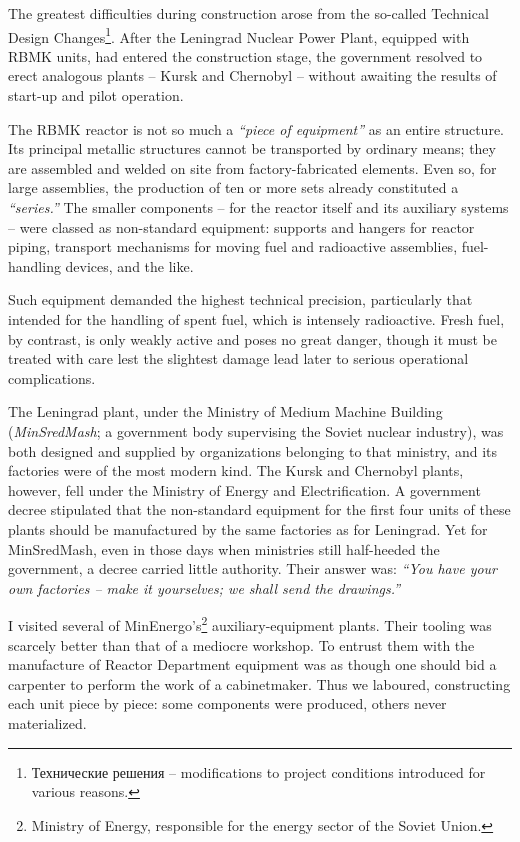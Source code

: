\documentclass[openright]{bookest}
\begin{document}
The greatest difficulties during construction arose from the so-called Technical Design Changes\footnote{Технические решения -- modifications to project conditions introduced for various reasons.}. After the Leningrad Nuclear Power Plant, equipped with RBMK units, had entered the construction stage, the government resolved to erect analogous plants -- Kursk and Chernobyl -- without awaiting the results of start-up and pilot operation.

The RBMK reactor is not so much a \textit{``piece of equipment''} as an entire structure. Its principal metallic structures cannot be transported by ordinary means; they are assembled and welded on site from factory-fabricated elements. Even so, for large assemblies, the production of ten or more sets already constituted a \textit{``series.''} The smaller components -- for the reactor itself and its auxiliary systems -- were classed as non-standard equipment: supports and hangers for reactor piping, transport mechanisms for moving fuel and radioactive assemblies, fuel-handling devices, and the like.

Such equipment demanded the highest technical precision, particularly that intended for the handling of spent fuel, which is intensely radioactive. Fresh fuel, by contrast, is only weakly active and poses no great danger, though it must be treated with care lest the slightest damage lead later to serious operational complications.

The Leningrad plant, under the Ministry of Medium Machine Building (\textit{MinSredMash}; a government body supervising the Soviet nuclear industry), was both designed and supplied by organizations belonging to that ministry, and its factories were of the most modern kind. The Kursk and Chernobyl plants, however, fell under the Ministry of Energy and Electrification. A government decree stipulated that the non-standard equipment for the first four units of these plants should be manufactured by the same factories as for Leningrad. Yet for MinSredMash, even in those days when ministries still half-heeded the government, a decree carried little authority. Their answer was: \textit{``You have your own factories -- make it yourselves; we shall send the drawings.''}

I visited several of MinEnergo's\footnote{Ministry of Energy, responsible for the energy sector of the Soviet Union.} auxiliary-equipment plants. Their tooling was scarcely better than that of a mediocre workshop. To entrust them with the manufacture of Reactor Department equipment was as though one should bid a carpenter to perform the work of a cabinetmaker. Thus we laboured, constructing each unit piece by piece: some components were produced, others never materialized.
\end{document}

